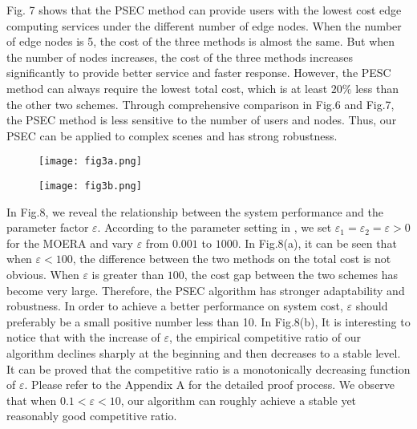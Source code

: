 \documentclass[journal,article,submit,pdftex,moreauthors]{Definitions/mdpi}
\begin{document}
Fig. 7 shows that the  PSEC method can provide users with the lowest cost edge computing services under the different number of edge nodes. When the number of edge nodes is 5, the cost of the three methods is almost the same. But when the number of nodes increases, the cost of the three methods increases significantly to provide better service and faster response. However, the PESC method can always require the lowest total cost, which is at least  $20\%$ less  than the other two schemes. Through comprehensive comparison in Fig.6 and Fig.7,  the PSEC method is less sensitive to the number of users and nodes. Thus, our PSEC can be applied to complex scenes  and has strong robustness.
\begin{figure}[H]
\centering
\texttt{[image: fig3a.png]} 

 \centering
\fontsize{6.5}{8}
\end{figure}
\begin{figure}[H]
\centering
\texttt{[image: fig3b.png]} 

 \centering
\fontsize{6.5}{8}
\end{figure}

In Fig.8, we reveal the relationship between the system performance and the  parameter factor $\varepsilon$. According to the parameter setting in \cite{WANG}, we set $\varepsilon_1=\varepsilon_2=\varepsilon>0$ for the MOERA and vary $\varepsilon$ from $0.001$ to $1000$.  In Fig.8(a), it can be seen that when $\varepsilon<100$, the difference between the two methods on the total cost is not obvious. When $\varepsilon$ is greater than $100$, the cost gap between  the two schemes has become very large.  Therefore, the PSEC algorithm has stronger adaptability and robustness. In order to achieve a better performance on system cost,   $\varepsilon$ should preferably be a small positive number less than 10. In Fig.8(b), It is interesting to notice that with the increase of $\varepsilon$, the empirical competitive ratio of our algorithm declines sharply at the beginning and then decreases to a stable level. It can be proved that the competitive ratio is a monotonically decreasing function of $\varepsilon$. Please refer to the Appendix  A for the detailed proof process. We observe that when $0.1<\varepsilon <10$,  our algorithm can
roughly achieve a stable yet reasonably good competitive ratio.
\end{document}
